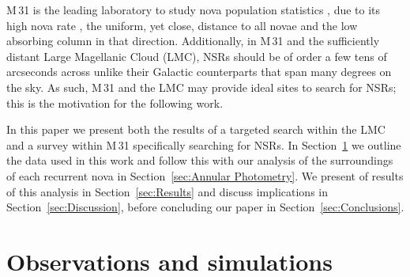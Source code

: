 \documentclass[fleqn,usenatbib]{mnras}
\begin{document}
M\,31 is the leading laboratory to study nova population statistics \citep{2019enhp.book.....S,2020AdSpR..66.1147D}, due to its high nova rate \citep{2006MNRAS.369..257D}, the uniform, yet close, distance to all novae and the low absorbing column in that direction. Additionally, in M\,31 and the sufficiently distant Large Magellanic Cloud (LMC), NSRs should be of order a few tens of arcseconds across unlike their Galactic counterparts that span many degrees on the sky. As such, M\,31 and the LMC may provide ideal sites to search for NSRs; this is the motivation for the following work.

In this paper we present both the results of a targeted search within the LMC and a survey within M\,31 specifically searching for NSRs. In Section~\ref{sec:Observations and simulations} we outline the data used in this work and follow this with our analysis of the surroundings of each recurrent nova in Section~\ref{sec:Annular Photometry}. We present of results of this analysis in Section~\ref{sec:Results} and discuss implications in Section~\ref{sec:Discussion}, before concluding our paper in Section~\ref{sec:Conclusions}.

\section{Observations and simulations}\label{sec:Observations and simulations}
\end{document}
